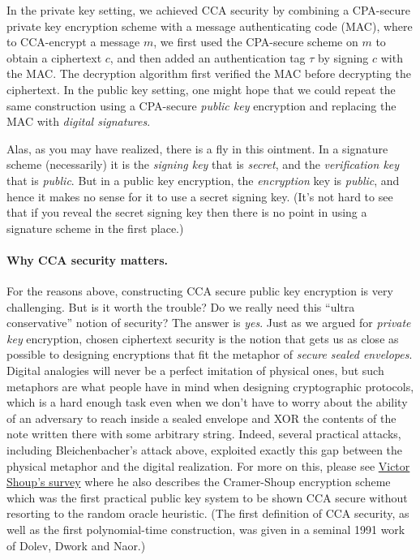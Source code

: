 In the private key setting, we achieved CCA security by combining a
CPA-secure private key encryption scheme with a message authenticating
code (MAC), where to CCA-encrypt a message \(m\), we first used the
CPA-secure scheme on \(m\) to obtain a ciphertext \(c\), and then added
an authentication tag \(\tau\) by signing \(c\) with the MAC. The
decryption algorithm first verified the MAC before decrypting the
ciphertext. In the public key setting, one might hope that we could
repeat the same construction using a CPA-secure \emph{public key}
encryption and replacing the MAC with \emph{digital signatures}.


Alas, as you may have realized, there is a fly in this ointment. In a
signature scheme (necessarily) it is the \emph{signing key} that is
\emph{secret}, and the \emph{verification key} that is \emph{public}.
But in a public key encryption, the \emph{encryption} key is
\emph{public}, and hence it makes no sense for it to use a secret
signing key. (It's not hard to see that if you reveal the secret signing
key then there is no point in using a signature scheme in the first
place.)

\paragraph{Why CCA security matters.} For the reasons above,
constructing CCA secure public key encryption is very challenging. But
is it worth the trouble? Do we really need this ``ultra conservative''
notion of security? The answer is \emph{yes}. Just as we argued for
\emph{private key} encryption, chosen ciphertext security is the notion
that gets us as close as possible to designing encryptions that fit the
metaphor of \emph{secure sealed envelopes}. Digital analogies will never
be a perfect imitation of physical ones, but such metaphors are what
people have in mind when designing cryptographic protocols, which is a
hard enough task even when we don't have to worry about the ability of
an adversary to reach inside a sealed envelope and XOR the contents of
the note written there with some arbitrary string. Indeed, several
practical attacks, including Bleichenbacher's attack above, exploited
exactly this gap between the physical metaphor and the digital
realization. For more on this, please see
\href{http://www.shoup.net/papers/expo.pdf}{Victor Shoup's survey} where
he also describes the Cramer-Shoup encryption scheme which was the first
practical public key system to be shown CCA secure without resorting to
the random oracle heuristic. (The first definition of CCA security, as
well as the first polynomial-time construction, was given in a seminal
1991 work of Dolev, Dwork and Naor.)


